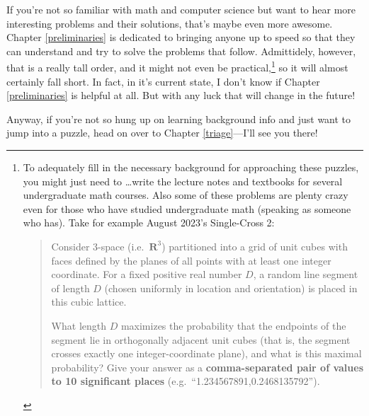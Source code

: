 \documentclass{book}
\begin{document}
If you're not so familiar with math and computer science but want to hear more interesting problems and their solutions, that's maybe even more awesome.
Chapter \ref{preliminaries} is dedicated to bringing anyone up to speed so that they can understand and try to solve the problems that follow. Admittidely, however, that is a really tall order, and it might not even be practical,\footnote{To adequately fill in the necessary background for approaching these puzzles, you might just need to \dots write the lecture notes and textbooks for several undergraduate math courses. Also some of these problems are plenty crazy even for those who have studied undergraduate math (speaking as someone who has). Take for example August 2023's Single-Cross 2:
\begin{quote}
  Consider 3-space (i.e.\ $\mathbf{R}^3$) partitioned into a grid of unit cubes with faces defined by the planes of all points with at least one integer coordinate. For a fixed positive real number $D$, a random line segment of length $D$ (chosen uniformly in location and orientation) is placed in this cubic lattice.

  What length $D$ maximizes the probability that the endpoints of the segment lie in orthogonally adjacent unit cubes (that is, the segment crosses exactly one integer-coordinate plane), and what is this maximal probability? Give your answer as a \textbf{comma-separated pair of values to 10 significant places} (e.g.\ ``1.234567891,0.2468135792'').
\end{quote}} so it will almost certainly fall short. In fact, in it's current state, I don't know if Chapter \ref{preliminaries} is helpful at all. But with any luck that will change in the future!

Anyway, if you're not so hung up on learning background info and just want to jump into a puzzle, head on over to Chapter \ref{triage}---I'll see you there!
\end{document}
